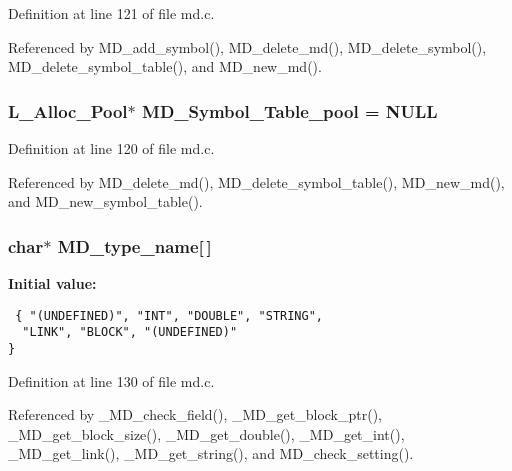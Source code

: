 Definition at line 121 of file md.c.

Referenced by MD\_\-add\_\-symbol(), MD\_\-delete\_\-md(), MD\_\-delete\_\-symbol(), MD\_\-delete\_\-symbol\_\-table(), and MD\_\-new\_\-md().
\subsubsection{\setlength{\rightskip}{0pt plus 5cm}\bf{L\_\-Alloc\_\-Pool}$\ast$ \bf{MD\_\-Symbol\_\-Table\_\-pool} = NULL\hspace{0.3cm}{\tt  [static]}}\label{md_8c_630f475b6f3ffbc306ebae2e486765fe}




Definition at line 120 of file md.c.

Referenced by MD\_\-delete\_\-md(), MD\_\-delete\_\-symbol\_\-table(), MD\_\-new\_\-md(), and MD\_\-new\_\-symbol\_\-table().
\subsubsection{\setlength{\rightskip}{0pt plus 5cm}char$\ast$ \bf{MD\_\-type\_\-name}[$\,$]\hspace{0.3cm}{\tt  [static]}}\label{md_8c_b0dc7a64c2a6b1da264cc3a365988e4f}


\textbf{Initial value:}

\begin{Code}\begin{verbatim} { "(UNDEFINED)", "INT", "DOUBLE", "STRING",
  "LINK", "BLOCK", "(UNDEFINED)"
}
\end{verbatim}\end{Code}


Definition at line 130 of file md.c.

Referenced by \_\-MD\_\-check\_\-field(), \_\-MD\_\-get\_\-block\_\-ptr(), \_\-MD\_\-get\_\-block\_\-size(), \_\-MD\_\-get\_\-double(), \_\-MD\_\-get\_\-int(), \_\-MD\_\-get\_\-link(), \_\-MD\_\-get\_\-string(), and MD\_\-check\_\-setting().
